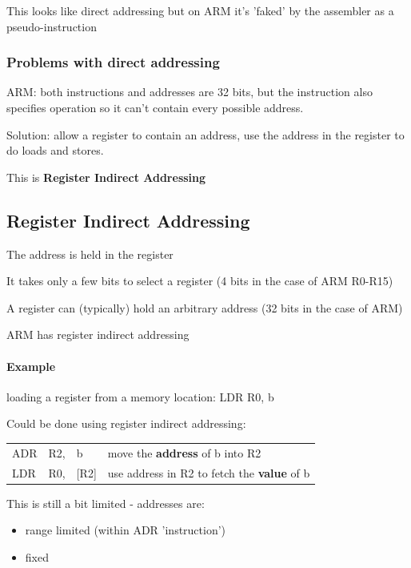 \documentclass{article}
\begin{document}
This looks like direct addressing but on ARM it's 'faked' by the assembler as a pseudo-instruction

\subsubsection{Problems with direct addressing}
ARM: both instructions and addresses are 32 bits, but the instruction also specifies operation so it can't contain every possible address.

Solution: allow a register to contain an address, use the address in the register to do loads and stores.

This is {\bf Register Indirect Addressing}

\subsection{Register Indirect Addressing}
The address is held in the register

It takes only a few bits to select a register (4 bits in the case of ARM R0-R15)

A register can (typically) hold an arbitrary address (32 bits in the case of ARM)

ARM has register indirect addressing

\paragraph{Example}
loading a register from a memory location: LDR R0, b

Could be done using register indirect addressing:

\begin{center}
    \begin{tabular}{l l l l}
        ADR & R2, & b & move the {\bf address} of b into R2\\
        LDR & R0, & [R2] & use address in R2 to fetch the {\bf value} of b\\
    \end{tabular}
\end{center}

This is still a bit limited - addresses are:

\begin{itemize}
  \item range limited (within ADR 'instruction')
  \item fixed
\end{itemize}
\end{document}
